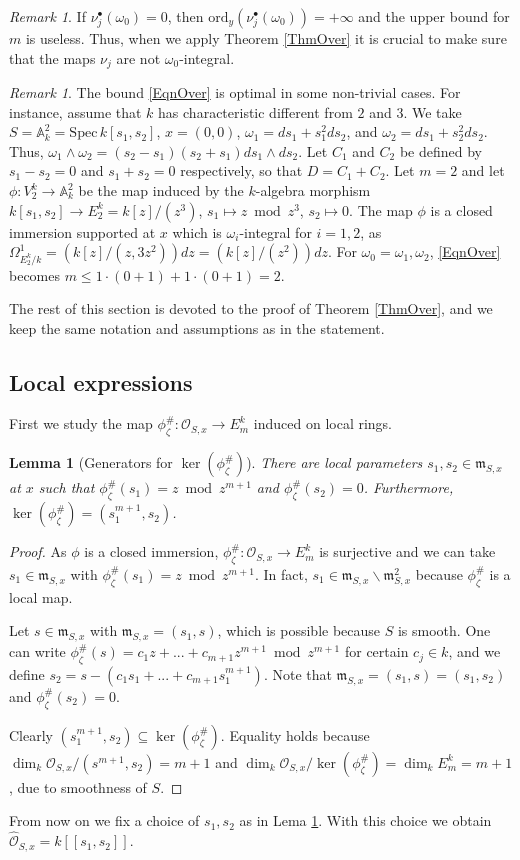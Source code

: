 \documentclass[11pt]{amsart}
\newtheorem{lemma}[theorem]{Lemma}
\theoremstyle{remark}
\newtheorem{remark}[theorem]{Remark}
\numberwithin{equation}{section}
\newcommand{\mfrak}{\mathfrak{m}}
\newcommand{\Ocal}{\mathscr{O}}
\newcommand{\A}{\mathbb{A}}
\newcommand{\ord}{\mathrm{ord}}
\newcommand{\Spec}{\mathrm{Spec}\,}
\begin{document}
\begin{remark} If $\nu_j^\bullet(\omega_0)=0$, then $\ord_y(\nu_j^\bullet(\omega_0))=+\infty$ and the upper bound for $m$ is useless. Thus, when we apply Theorem \ref{ThmOver} it is crucial to make sure that the maps $\nu_j$ are not $\omega_0$-integral.
\end{remark}

\begin{remark} \label{RmkSharp} The bound \eqref{EqnOver} is optimal in some non-trivial cases. For instance, assume that $k$ has characteristic different from $2$ and $3$.  We take $S=\A^2_k=\Spec k[s_1,s_2]$, $x=(0,0)$, $\omega_1=ds_1+s_1^2ds_2$, and $\omega_2=ds_1+s_2^2ds_2$. Thus, $\omega_1\wedge\omega_2 = (s_2-s_1)(s_2+s_1)ds_1\wedge ds_2$. Let $C_1$ and $C_2$ be defined by $s_1-s_2=0$ and $s_1+s_2=0$ respectively, so that $D=C_1+C_2$. Let $m=2$ and let $\phi :V_2^k\to \A^2_k$ be the map induced by the $k$-algebra morphism $k[s_1,s_2]\to E_2^k=k[z]/(z^3)$, $s_1\mapsto z\bmod z^3$, $s_2\mapsto 0$. The map $\phi$ is a closed immersion supported at $x$ which is $\omega_i$-integral for $i=1,2$, as $\Omega^1_{E_2^k/k}=(k[z]/(z,3z^2))dz=(k[z]/(z^2))dz$. For $\omega_0=\omega_1,\omega_2$,  \eqref{EqnOver} becomes $m\le 1\cdot (0+1) + 1\cdot (0+1)=2$.
\end{remark}

The rest of this section is devoted to the proof of Theorem \ref{ThmOver}, and we keep the same notation and assumptions as in the statement. 

\subsection{Local expressions} First we study the map $\phi_\zeta^\#:\Ocal_{S,x}\to E_m^k$ induced on local rings.
\begin{lemma}[Generators for $\ker(\phi^\#_\zeta)$] \label{LemmaGenOver} There are local parameters $s_1,s_2\in \mfrak_{S,x}$ at $x$ such that $\phi^\#_\zeta(s_1)=z \bmod z^{m+1}$ and $\phi^\#_\zeta(s_2)=0$. Furthermore, $\ker(\phi^\#_\zeta)=(s_1^{m+1},s_2)$.
\end{lemma}
\begin{proof} As $\phi$ is a closed immersion, $\phi^\#_\zeta:\Ocal_{S,x}\to E_m^k$ is surjective and we can take $s_1\in \mfrak_{S,x}$ with $\phi^\#_\zeta(s_1)=z\bmod z^{m+1}$. In fact, $s_1\in \mfrak_{S,x}\smallsetminus \mfrak_{S,x}^2$ because $\phi^\#_\zeta$ is a local map. 

Let $s\in \mfrak_{S,x}$ with $\mfrak_{S,x}=(s_1,s)$, which is possible because $S$ is smooth.  One can write $\phi^\#_\zeta(s)=c_1z+...+c_{m+1} z^{m+1}\bmod z^{m+1}$ for certain $c_j\in k$, and we define $s_2=s -  (c_1s_1+...+c_{m+1} s_1^{m+1})$. Note that $\mfrak_{S,x}=(s_1,s)=(s_1,s_2)$ and $\phi^\#_\zeta(s_2)=0$. 

Clearly $(s_1^{m+1},s_2)\subseteq \ker(\phi^\#_\zeta)$. Equality holds because  $\dim_k \Ocal_{S,x}/(s^{m+1},s_2)=m+1$ and $\dim_k \Ocal_{S,x}/\ker(\phi^\#_\zeta)=\dim_k E_m^k=m+1$, due to smoothness of $S$.
\end{proof}
From now on we fix a choice of $s_1,s_2$ as in Lema \ref{LemmaGenOver}. With this choice we obtain $\widehat{\Ocal}_{S,x}=k[[s_1,s_2]]$. 
\end{document}
